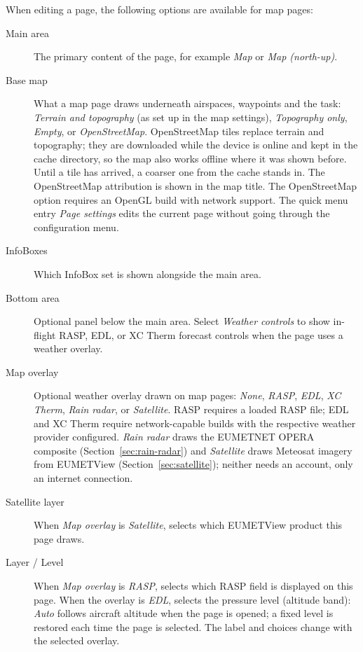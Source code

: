 When editing a page, the following options are available for map pages:
\begin{description}
\item[Main area]  The primary content of the page, for example \emph{Map}
  or \emph{Map (north-up)}.
\item[Base map]  What a map page draws underneath airspaces,
  waypoints and the task: \emph{Terrain and topography} (as set up in
  the map settings), \emph{Topography only}, \emph{Empty}, or
  \emph{OpenStreetMap}.  OpenStreetMap tiles replace terrain and
  topography; they are downloaded while the device is online and kept
  in the cache directory, so the map also works offline where it was
  shown before.  Until a tile has arrived, a coarser one from the cache
  stands in.  The OpenStreetMap attribution is shown in the map title.
  The OpenStreetMap option requires an OpenGL build with network
  support.  The quick menu entry \emph{Page settings} edits the
  current page without going through the configuration menu.
\item[InfoBoxes]  Which InfoBox set is shown alongside the main area.
\item[Bottom area]  Optional panel below the main area.  Select
  \emph{Weather controls} to show in-flight RASP, EDL, or XC Therm forecast
  controls when the page uses a weather overlay.
\item[Map overlay]  Optional weather overlay drawn on map pages: \emph{None},
  \emph{RASP}, \emph{EDL}, \emph{XC Therm}, \emph{Rain radar}, or
  \emph{Satellite}.  RASP requires a loaded RASP file; EDL and XC Therm
  require network-capable builds with the respective weather provider
  configured.  \emph{Rain radar} draws the EUMETNET OPERA composite
  (Section~\ref{sec:rain-radar}) and \emph{Satellite} draws Meteosat
  imagery from EUMETView (Section~\ref{sec:satellite}); neither needs an
  account, only an internet connection.
\item[Satellite layer]  When \emph{Map overlay} is \emph{Satellite},
  selects which EUMETView product this page draws.
\item[Layer / Level]  When \emph{Map overlay} is \emph{RASP}, selects
  which RASP field is displayed on this page.  When the overlay is
  \emph{EDL}, selects the pressure level (altitude band): \emph{Auto}
  follows aircraft altitude when the page is opened; a fixed level is
  restored each time the page is selected.  The label and choices
  change with the selected overlay.
\end{description}


